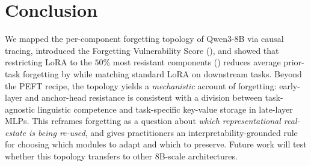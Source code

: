 \section{Conclusion}
\label{sec:conclusion}

We mapped the per-component forgetting topology of Qwen3-8B via causal tracing, introduced the Forgetting Vulnerability Score (\fvs{}), and showed that restricting LoRA to the $50\%$ most resistant components (\tglora{}) reduces average prior-task forgetting by  while matching standard LoRA on downstream tasks. Beyond the PEFT recipe, the topology yields a \textit{mechanistic} account of forgetting: early-layer and anchor-head resistance is consistent with a division between task-agnostic linguistic competence and task-specific key-value storage in late-layer MLPs. This reframes forgetting as a question about \textit{which representational real-estate is being re-used}, and gives practitioners an interpretability-grounded rule for choosing which modules to adapt and which to preserve. Future work will test whether this topology transfers to other 8B-scale architectures.
